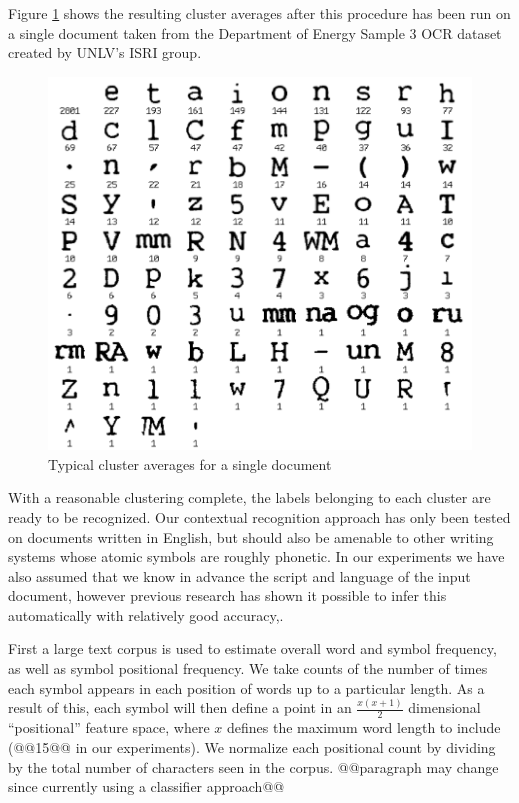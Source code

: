 \documentclass[times, 10pt,twocolumn]{article}
\begin{document}
Figure \ref{clavg_fig} shows the resulting cluster averages after this
procedure has been run on a single document taken from the Department of Energy
Sample 3 OCR dataset created by UNLV's ISRI group\cite{nartker2005}.

\begin{figure}[ht]
  \centering
  \includegraphics[scale=.5]{figures/cluster_averages}
  \caption{Typical cluster averages for a single document}
  \label{clavg_fig}
\end{figure}



With a reasonable clustering complete, the labels belonging to each cluster are
ready to be recognized.  Our contextual recognition approach has only been
tested on documents written in English, but should also be amenable to other
writing systems whose atomic symbols are roughly phonetic.  In our experiments
we have also assumed that we know in advance the script and language of the
input document, however previous research has shown it possible to infer this
automatically with relatively good accuracy\cite{sibun1994},\cite{hochberg1997}.

First a large text corpus is used to estimate overall word and symbol frequency,
as well as symbol positional frequency.  We take counts of the number of times
each symbol appears in each position of words up to a particular length.  As
a result of this, each symbol will then define a point in an $\frac{x
(x+1)}{2}$ dimensional ``positional'' feature space, where $x$ defines the
maximum word length to include (@@15@@ in our experiments).  We normalize each 
positional count by dividing by the total number of characters seen in the 
corpus.  @@paragraph may change since currently using a classifier approach@@
\end{document}

